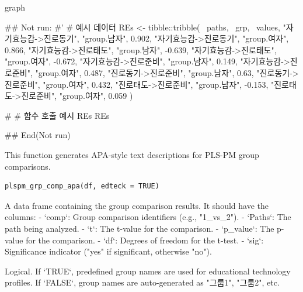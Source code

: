 \documentclass[a4paper]{book}
\begin{document}
%
\begin{Value}
graph
\end{Value}
%
\begin{Examples}
\begin{ExampleCode}

\#\# Not run: 
#'
# 예시 데이터
REs <- tibble::tribble(
  ~paths, ~grp, ~values,
  "자기효능감->진로동기", "group.남자", 0.902,
  "자기효능감->진로동기", "group.여자", 0.866,
  "자기효능감->진로태도", "group.남자", -0.639,
  "자기효능감->진로태도", "group.여자", -0.672,
  "자기효능감->진로준비", "group.남자", 0.149,
  "자기효능감->진로준비", "group.여자", 0.487,
  "진로동기->진로준비", "group.남자", 0.63,
  "진로동기->진로준비", "group.여자", 0.432,
  "진로태도->진로준비", "group.남자", -0.153,
  "진로태도->진로준비", "group.여자", 0.059
)

# # 함수 호출 예시
REs %
REs %

## End(Not run)
\end{ExampleCode}
\end{Examples}
%
\begin{Description}
This function generates APA-style text descriptions for PLS-PM group comparisons.
\end{Description}
%
\begin{Usage}
\begin{verbatim}
plspm_grp_comp_apa(df, edteck = TRUE)
\end{verbatim}
\end{Usage}
%
\begin{Arguments}
\begin{ldescription}
\item[\code{df}] A data frame containing the group comparison results. It should have the columns:
- `comp`: Group comparison identifiers (e.g., "1\_vs\_2").
- `Paths`: The path being analyzed.
- `t`: The t-value for the comparison.
- `p\_value`: The p-value for the comparison.
- `df`: Degrees of freedom for the t-test.
- `sig`: Significance indicator ("yes" if significant, otherwise "no").

\item[\code{edteck}] Logical. If `TRUE`, predefined group names are used for educational technology profiles.
If `FALSE`, group names are auto-generated as "그룹1", "그룹2", etc.
\end{ldescription}
\end{Arguments}
\end{document}
